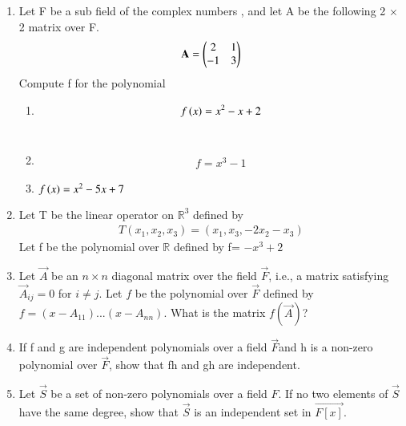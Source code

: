 \renewcommand{\theequation}{\theenumi}
\renewcommand{\thefigure}{\theenumi}
\begin{enumerate}[label=\thesubsection.\arabic*.,ref=\thesubsection.\theenumi]

\item Let F be a sub field of the complex numbers , and let A be the following 2 $\times$ 2 matrix over F.
\begin{align}
  \mathbf{A}=\begin{pmatrix}2&1\\-1&3\end{pmatrix}  
\end{align}
Compute f for the polynomial
\begin{enumerate}
\item 
\begin{align}
    f\left(x\right)=x^{2}-x+2
\end{align}
%
\\
\solution

\item
\begin{align}
f = x^3 - 1
\end{align}
\solution

%
\item 
$f\left(x\right)=x^{2}-5x+7$
%
\\
\solution

\end{enumerate}
\item Let T be the linear operator on $\mathbb{R}^3$ defined by
\begin{align}
T(x_1,x_2,x_3)=(x_1,x_3,-2x_2-x_3)
\end{align}
Let f be the polynomial over $\mathbb{R}$ defined by f= $-x^3+2$
%
\\
\solution

\item Let $\vec{A}$ be an $n \times n$ diagonal matrix over the field $\vec{F}$, i.e., a matrix satisfying $\vec{A}_{ij} = 0$ for $i \neq j$. Let $f$ be the polynomial over $\vec{F}$ defined by $f = (x - A_{11}) . . . (x - A_{nn})$. What is the matrix $f(\vec{A})$? 
%
\\
\solution

\item If f  and g are independent polynomials over a field $\vec{F}$and h is a non-zero
polynomial over $\vec{F}$, show that fh and gh are independent.
%
\\
\solution

\item Let $\vec{S}$ be a set of non-zero polynomials over a field $F$. If no two elements of $\vec{S}$ have the same degree, show that $\vec{S}$ is an independent set in $\vec{F[x]}$.

\end{enumerate}

